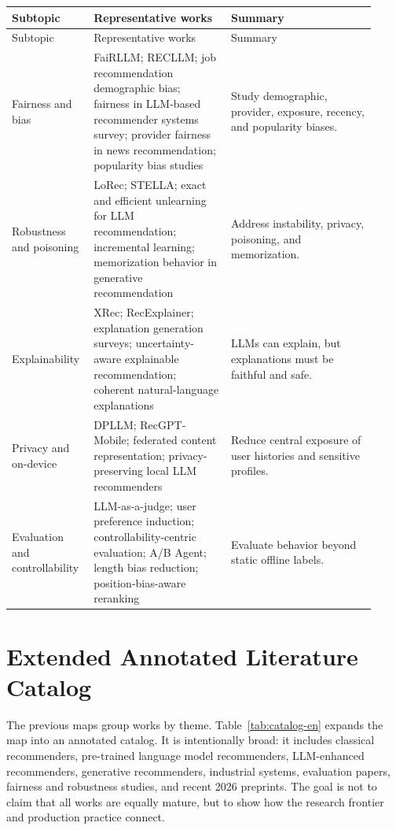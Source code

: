 \documentclass[11pt]{article}
\begin{document}
\small
\begin{longtable}{@{}p{0.18\linewidth}p{0.36\linewidth}p{0.38\linewidth}@{}}
\toprule
Subtopic & Representative works & Summary\\
\midrule
\endfirsthead
\toprule
Subtopic & Representative works & Summary\\
\midrule
\endhead
Fairness and bias & FaiRLLM; RECLLM; job recommendation demographic bias; fairness in LLM-based recommender systems survey; provider fairness in news recommendation; popularity bias studies & Study demographic, provider, exposure, recency, and popularity biases.\\
Robustness and poisoning & LoRec; STELLA; exact and efficient unlearning for LLM recommendation; incremental learning; memorization behavior in generative recommendation & Address instability, privacy, poisoning, and memorization.\\
Explainability & XRec; RecExplainer; explanation generation surveys; uncertainty-aware explainable recommendation; coherent natural-language explanations & LLMs can explain, but explanations must be faithful and safe.\\
Privacy and on-device & DPLLM; RecGPT-Mobile; federated content representation; privacy-preserving local LLM recommenders & Reduce central exposure of user histories and sensitive profiles.\\
Evaluation and controllability & LLM-as-a-judge; user preference induction; controllability-centric evaluation; A/B Agent; length bias reduction; position-bias-aware reranking & Evaluate behavior beyond static offline labels.\\
\bottomrule
\end{longtable}
\normalsize

\section{Extended Annotated Literature Catalog}

The previous maps group works by theme. Table~\ref{tab:catalog-en} expands the map into an annotated catalog. It is intentionally broad: it includes classical recommenders, pre-trained language model recommenders, LLM-enhanced recommenders, generative recommenders, industrial systems, evaluation papers, fairness and robustness studies, and recent 2026 preprints. The goal is not to claim that all works are equally mature, but to show how the research frontier and production practice connect.
\end{document}
